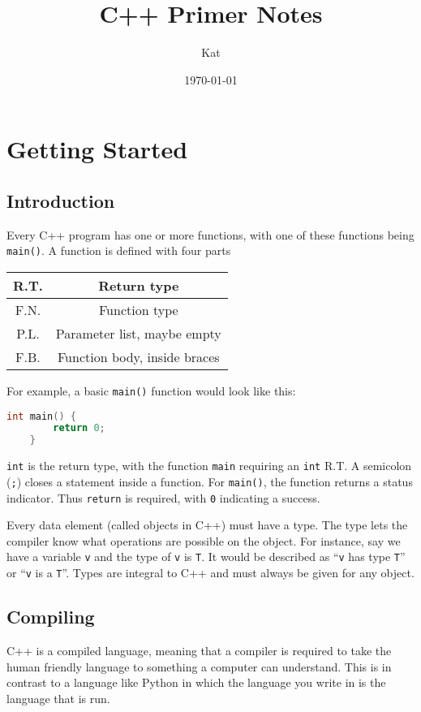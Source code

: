 \documentclass[12pt, a4paper]{report}
\title{C++ Primer Notes}
\author{Kat}
\date{\today}
\begin{document}
\maketitle
\tableofcontents
\newpage
\chapter{Getting Started}
\section{Introduction}
Every C++ program has one or more functions, with one of these functions being \verb|main()|. A function is defined with four parts
\begin{center}
	\begin{tabular}{ |c|c| }
		\hline
		R.T. & Return type \\
		\hline
		F.N. & Function type \\
		\hline
		P.L. & Parameter list, maybe empty \\
		\hline
		F.B. & Function body, inside braces \\
		\hline
	\end{tabular}
\end{center}
For example, a basic \verb|main()| function would look like this:
\begin{center}
\begin{lstlisting}[language=C++]
	int main() { 
		return 0;
	}
\end{lstlisting}
\end{center}
\verb|int| is the return type, with the function \verb|main| requiring an \verb|int| R.T. A semicolon (\verb|;|) closes a statement inside a function. For \verb|main()|, the function returns a status indicator. Thus \verb|return| is required, with \verb|0| indicating a success.

Every data element (called objects in C++) must have a type. The type lets the compiler know what operations are possible on the object. 
For instance, say we have a variable \verb|v| and the type of \verb|v| is \verb|T|. It would be described as ``\verb|v| has type \verb|T|''
or ``\verb|v| is a \verb|T|''. Types are integral to C++ and must always be given for any object.
\section{Compiling}
C++ is a compiled language, meaning that a compiler is required to take the human friendly language to something a computer can understand.
This is in contrast to a language like Python in which the language you write in is the language that is run.
\end{document}

